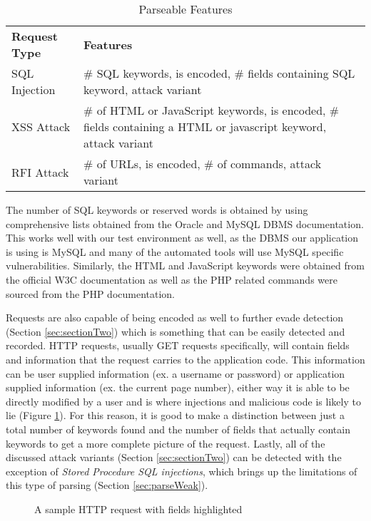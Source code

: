 \begin{table}
	\centering
	\begin{tabular}{|p{1.5in}|p{4.5in}|}
	\hline
		\textbf{Request Type} & \textbf{Features}\\
	\hhline{|=|=|}
		SQL Injection & \# SQL keywords, is encoded, \# fields containing SQL keyword, attack variant\\
	\hline
		XSS Attack & \# of HTML or JavaScript keywords, is encoded, \# fields containing a HTML or javascript keyword, attack variant\\
	\hline
		RFI Attack & \# of URLs, is encoded, \# of commands, attack variant\\
	\hline
	\end{tabular}
	\caption{Parseable Features}
	\label{tab:features}
\end{table}

The number of SQL keywords or reserved words is obtained by using comprehensive lists obtained from the Oracle and MySQL DBMS documentation.\cite{oracle}\cite{mysql}  This works well with our test environment as well, as the DBMS our application is using is MySQL and many of the automated tools will use MySQL specific vulnerabilities.  Similarly, the HTML and JavaScript keywords were obtained from the official W3C documentation\cite{w3c1}\cite{w3c2}\cite{w3c3} as well as the PHP related commands were sourced from the PHP documentation.\cite{php}

Requests are also capable of being encoded as well to further evade detection (Section \ref{sec:sectionTwo}) which is something that can be easily detected and recorded.  HTTP requests, usually GET requests specifically, will contain fields and information that the request carries to the application code.  This information can be user supplied information (ex. a username or password) or application supplied information (ex. the current page number), either way it is able to be directly modified by a user and is where injections and malicious code is likely to lie (Figure \ref{fig:sampleRequest}).  For this reason, it is good to make a distinction between just a total number of keywords found and the number of fields that actually contain keywords to get a more complete picture of the request.  Lastly, all of the discussed attack variants (Section \ref{sec:sectionTwo}) can be detected with the exception of \emph{Stored Procedure SQL injections}, which brings up the limitations of this type of parsing (Section \ref{sec:parseWeak}).

\begin{figure}
	\centering
	\caption{A sample HTTP request with fields highlighted}
	\label{fig:sampleRequest}
\end{figure}

